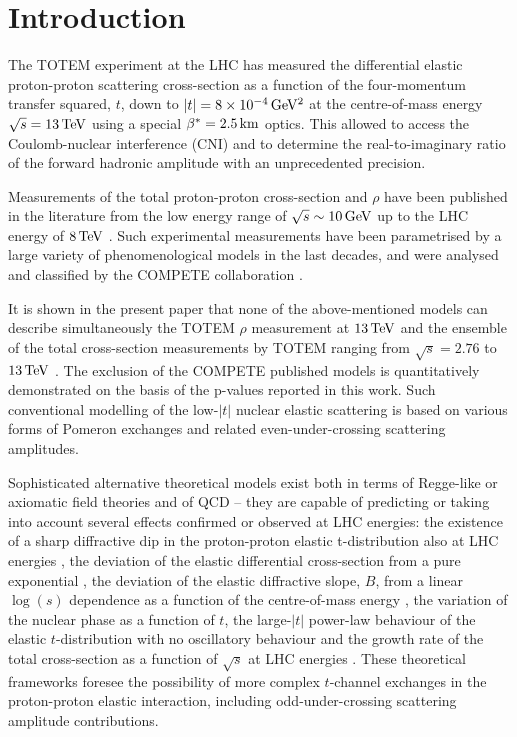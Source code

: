 \section{Introduction}
\label{sec:introduction}

The TOTEM experiment at the LHC has measured the differential elastic proton-proton scattering cross-section as a function of the four-momentum transfer squared, $t$, down to $|t| = 8\times10^{-4}\,{\rm GeV^2}$ at the centre-of-mass energy $\sqrt s = 13\,{\rm TeV}$ using a special $\beta^* = 2.5\,{\rm km}$ optics. This allowed to access the Coulomb-nuclear interference (CNI) and to determine the real-to-imaginary ratio of the forward hadronic amplitude with an unprecedented precision.

Measurements of the total proton-proton cross-section and $\rho$ have been published in the literature from the low energy range of $\sqrt s \sim 10\,{\rm GeV}$ up to the LHC energy of $8\,{\rm TeV}$ \cite{pdg-2016}. Such experimental measurements have been parametrised by a large variety of phenomenological models in the last decades, and were analysed and classified by the COMPETE collaboration \cite{compete}.

It is shown in the present paper that none of the above-mentioned models can describe simultaneously the TOTEM $\rho$ measurement at $13\,{\rm TeV}$ and the ensemble of the total cross-section measurements by TOTEM ranging from $\sqrt s = 2.76$ to $13\,{\rm TeV}$ \cite{totem-7tev-tot2,totem-8tev-90m,totem-8tev-1km,totem-13tev-90m}. The exclusion of the COMPETE published models is quantitatively demonstrated on the basis of the p-values reported in this work. Such conventional modelling of the low-$|t|$ nuclear elastic scattering is based on various forms of Pomeron exchanges and related even-under-crossing scattering amplitudes.

Sophisticated alternative theoretical models exist both in terms of Regge-like or axiomatic field theories \cite{nicolescu-1992} and of QCD \cite{braun} -- they are capable of predicting or taking into account several effects confirmed or observed at LHC energies: the existence of a sharp diffractive dip in the proton-proton elastic t-distribution also at LHC energies \cite{totem-7tev-first}, the deviation of the elastic differential cross-section from a pure exponential \cite{totem-8tev-90m}, the deviation of the elastic diffractive slope, $B$, from a linear $\log(s)$ dependence as a function of the centre-of-mass energy \cite{totem-13tev-90m}, the variation of the nuclear phase as a function of $t$, the large-$|t|$ power-law behaviour of the elastic $t$-distribution with no oscillatory behaviour and the growth rate of the total cross-section as a function of $\sqrt s$ at LHC energies \cite{totem-13tev-90m}. These theoretical frameworks foresee the possibility of more complex $t$-channel exchanges in the proton-proton elastic interaction, including odd-under-crossing scattering amplitude contributions.

